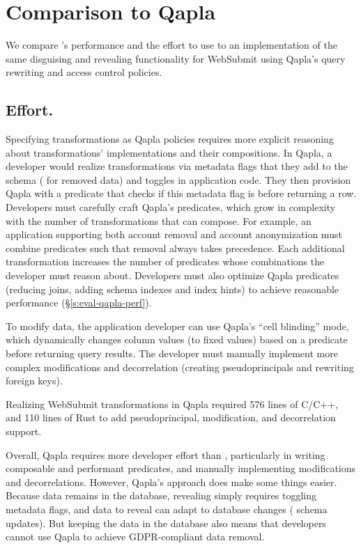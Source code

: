 \section{Comparison to Qapla}
\label{s:eval-qapla}

We compare \sys's performance and the effort to use \sys to an implementation of
the same disguising and revealing functionality for WebSubmit using
Qapla’s query rewriting and access control policies.
%

%
\subsection{Effort.}
%
Specifying \xxing transformations as Qapla policies requires more
explicit reasoning about transformations' implementations and their
compositions.
%
In Qapla, a developer would realize \xxing transformations via metadata flags
that they add to the schema (\eg {} for removed data) and toggles in
application code. They then provision Qapla with a predicate that checks if
this metadata flag is  before returning a row.
%
Developers must carefully craft Qapla's predicates, which grow in complexity
with the number of \xxing transformations that can compose. For example, an
application supporting both account removal and account anonymization must
combine predicates such that removal always takes precedence. Each additional
transformation increases the number of predicates whose combinations the
developer must reason about.
%
Developers must also optimize Qapla predicates (\eg reducing joins, adding
schema indexes and index hints) to achieve reasonable performance
(\S\ref{s:eval-qapla-perf}).

%
To modify data, the application developer can use Qapla's ``cell blinding''
mode, which dynamically changes column values (to fixed values) based on a
predicate before returning query results.
%
The developer must manually implement more complex modifications and
decorrelation (\ie creating pseudoprincipals and rewriting foreign keys).
%

%
Realizing WebSubmit transformations in Qapla required 576 lines of C/C++, and
110 lines of Rust to add pseudoprincipal, modification, and decorrelation
support.
%

Overall, Qapla requires more developer effort than \sys, particularly in writing
composable and performant predicates, and manually implementing modifications
and decorrelations. However, Qapla's approach does make some things easier.
%
Because data remains in the database, revealing simply requires toggling
metadata flags, and data to reveal can adapt to database changes (\eg
schema updates). But keeping the data in the database also means that developers cannot use Qapla to
achieve GDPR-compliant data removal. %


